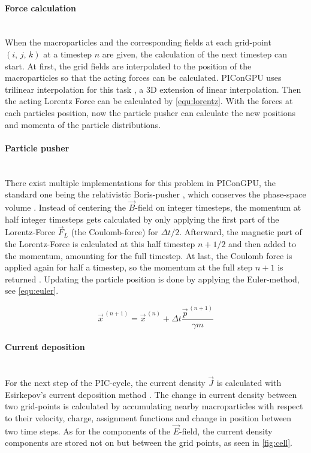 \documentclass[bachelor_thesis]{subfiles}
\begin{document}
\paragraph*{Force calculation}\hspace{0pt} \\
When the macroparticles and the corresponding fields at each grid-point $(i, \, j, \,k)$ at a timestep $n$ are given, the calculation of the next timestep can start.
At first, the grid fields are interpolated to the position of the macroparticles so that the acting forces can be calculated. PIConGPU uses trilinear interpolation for this task \cite{Huebl2019, PICRepo}, a 3D extension of linear interpolation.
Then the acting Lorentz Force can be calculated by \autoref{equ:lorentz}. With the forces at each particles position, now the particle pusher can calculate the new positions and momenta of the particle distributions.

\paragraph*{Particle pusher}\hspace{0pt} \\
There exist multiple implementations for this problem in PIConGPU, the standard one being the relativistic Boris-pusher \cite{Boris1970}, which conserves the phase-space volume \cite{PICRepo}. Instead of centering the $\vec{B}$-field on integer timesteps, the momentum at half integer timesteps gets
calculated by only applying the first part of the Lorentz-Force $\vec{F}_L$ (the Coulomb-force) for $\Delta t/2$. Afterward, the magnetic part of the Lorentz-Force is calculated at this half timestep $n+1/2$ and then added to the momentum, amounting for the full timestep.
At last, the Coulomb force is applied again for half a timestep, so the momentum at the full step $n+1$ is returned \cite{Zenitani2018, Pausch2019}. Updating the particle position is done by applying the Euler-method, see \autoref{equ:euler}.

\begin{equation}
	\vec{x}^{\,(n+1)} = \vec{x}^{\,(n)} + \Delta t \frac{\vec{p}^{\,(n+1)}}{\gamma m}
	\label{equ:euler}
\end{equation}

\paragraph*{Current deposition}\hspace{0pt} \\
For the next step of the PIC-cycle, the current density $\vec{J}$ is calculated with Esirkepov’s current deposition method \cite{Esirkepov2001}.
The change in current density between two grid-points is calculated by accumulating nearby macroparticles with respect to their velocity, charge, assignment functions and change in position between two time steps. 
As for the components of the $\vec{E}$-field, the current density components are stored not on but between the grid points, as seen in \autoref{fig:cell}.
\end{document}

